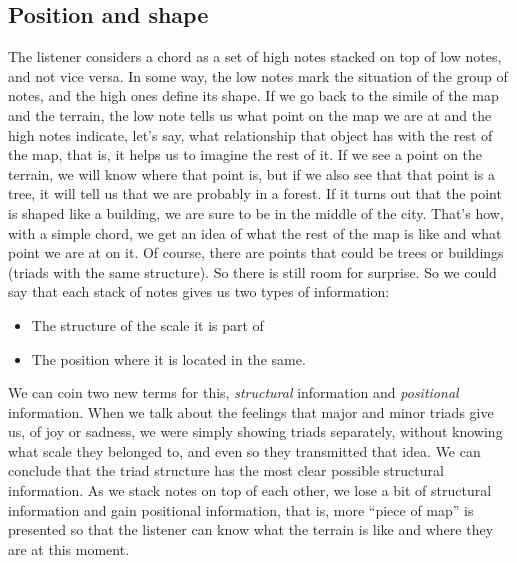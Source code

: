 \documentclass[]{report}
\providecommand{\tightlist}{%
\setlength{\itemsep}{0pt}
\setlength{\parskip}{0pt}
}
\begin{document}
\subsection{Position and shape}
The listener considers a chord as a set of high notes stacked on top of low notes, and not vice versa. In some way, the low notes mark the situation of the group of notes, and the high ones define its shape.
If we go back to the simile of the map and the terrain, the low note tells us what point on the map we are at and the high notes indicate, let's say, what relationship that object has with the rest of the map, that is, it helps us to imagine the rest of it.
If we see a point on the terrain, we will know where that point is, but if we also see that that point is a tree, it will tell us that we are probably in a forest. If it turns out that the point is shaped like a building, we are sure to be in the middle of the city. That's how, with a simple chord, we get an idea of what the rest of the map is like and what point we are at on it. Of course, there are points that could be trees or buildings (triads with the same structure). So there is still room for surprise.
So we could say that each stack of notes gives us two types of information:
\begin{itemize}
\tightlist
\item The structure of the scale it is part of
\item The position where it is located in the same.
\end{itemize}
We can coin two new terms for this, \emph{structural} information and \emph{positional} information. When we talk about the feelings that major and minor triads give us, of joy or sadness, we were simply showing triads separately, without knowing what scale they belonged to, and even so they transmitted that idea. We can conclude that the triad structure has the most clear possible structural information. As we stack notes on top of each other, we lose a bit of structural information and gain positional information, that is, more ``piece of map'' is presented so that the listener can know what the terrain is like and where they are at this moment.
\end{document}

